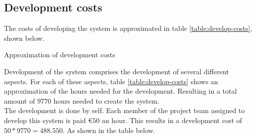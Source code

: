 \subsection{Development costs}
The costs of developing the system is approximated in table \ref{table:develop-costs}, shown below.
\newline
\begin{table}[H]
\caption{Approximation of development costs}
\label{table:develop-costs}
\end{table}
Development of the system comprises the development of several different aspects. For each of these aspects, table \ref{table:develop-costs} shows an approximation of the hours needed for the development. Resulting in a total amount of $9770$ hours needed to create the system.\\
The development is done by \CompanyName self. Each member of the project team assigned to develop this system is paid $\euro{}50$ an hour. This results in a development cost of $50*9770=488.550$. As shown in the table below.


\tdevcost

